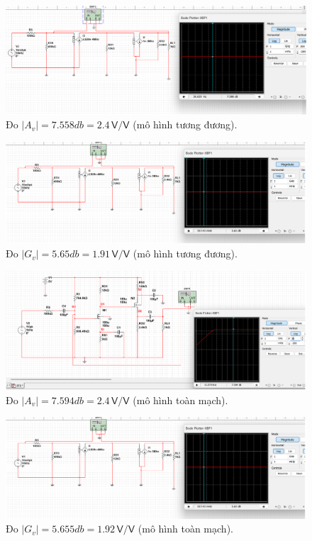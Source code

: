 \begin{itemize}[label=-]
	\begin{figure}[H]
		\centering
		\includegraphics[width=.9\linewidth]{./my-chapters/my-images/Question8/b_av_tuongduong.png}
		\caption{Đo $|A_{v}| =7.558 db = 2.4 \,\textsf{V/V}$ (mô hình tương đương).}
	\end{figure}
	\begin{figure}[H]
		\centering
		\includegraphics[width=.9\linewidth]{./my-chapters/my-images/Question8/b_gv_tuongduong.png}
		\caption{Đo $|G_{v}| = 5.65db = 1.91 \,\textsf{V/V}$ (mô hình tương đương).}
	\end{figure}
	\begin{figure}[H]
		\centering
		\includegraphics[width=.9\linewidth]{./my-chapters/my-images/Question8/b_av_toanmach.png}
		\caption{Đo $|A_{v}| = 7.594db = 2.4 \,\textsf{V/V}$ (mô hình toàn mạch).}
	\end{figure}
	\begin{figure}[H]
		\centering
		\includegraphics[width=.9\linewidth]{./my-chapters/my-images/Question8/b_gv_tuongduong.png}
		\caption{Đo $|G_{v}| = 5.655 db = 1.92 \,\textsf{V/V}$ (mô hình toàn mạch).}
	\end{figure}
\end{itemize}

